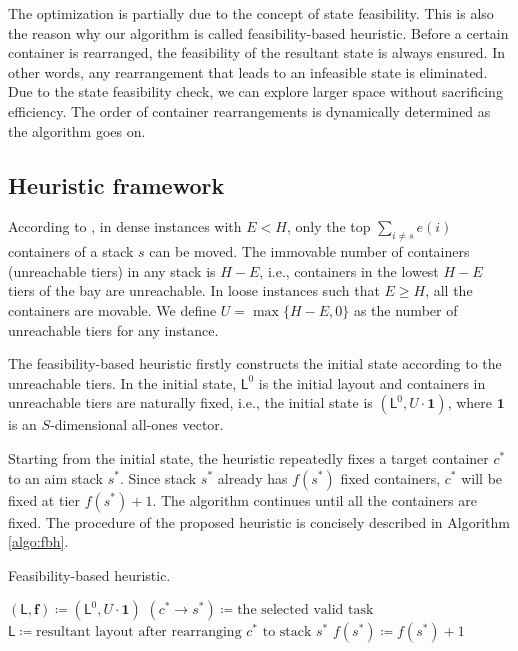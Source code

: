 \documentclass[review,3p,times,12pt,number]{elsarticle}\usepackage{amsmath}\usepackage{amssymb}
\renewcommand{\citet}[1]{\citeauthor{#1} \citep{#1}}
\renewcommand{\gets}{\coloneqq}
\newcommand{\setalgo}{\linespread{1}\fontsize{10}{12}\selectfont}
\begin{document}
The optimization is partially due to the concept of state feasibility.
This is also the reason why our algorithm is called feasibility-based heuristic.
Before a certain container is rearranged, the feasibility of the resultant state is always ensured.
In other words, any rearrangement that leads to an infeasible state is eliminated.
Due to the state feasibility check, we can explore larger space without sacrificing efficiency. The order of container rearrangements is dynamically determined as the algorithm goes on.



\subsection{Heuristic framework}

According to \citet{wang2014}, in dense instances with $E<H$, only the top $\sum_{i\neq s}e(i)$ containers of a stack $s$ can be moved. The immovable number of containers (unreachable tiers) in any stack is $H-E$, i.e., containers in the lowest $H-E$ tiers of the bay are unreachable.
In loose instances such that $E\ge H$, all the containers are movable.
We define $U=\max\{H-E,0\}$ as the number of unreachable tiers for any instance.


The feasibility-based heuristic firstly constructs the initial state according to the unreachable tiers. In the initial state, $\mathsf{L}^0$ is the initial layout and containers in unreachable tiers are naturally fixed, i.e., the initial state is $(\mathsf{L}^0,U\cdot\boldsymbol{1})$, where $\boldsymbol 1$ is an $S$-dimensional all-ones vector.

Starting from the initial state, the heuristic repeatedly fixes a target container $c^*$ to an aim stack $s^*$.
Since stack $s^*$ already has $f(s^*)$ fixed containers, $c^*$ will be fixed at tier $f(s^*)+1$. The algorithm continues until all the containers are fixed. The procedure of the proposed heuristic is concisely described in Algorithm \ref{algo:fbh}.

\begin{algorithm}[htbp]
\caption{Feasibility-based heuristic.}
\label{algo:fbh}


\setalgo


\Begin
{
  $(\mathsf{L},\boldsymbol{f})\gets (\mathsf{L}^0,U\cdot\boldsymbol{1})$\;
  {
    $(c^*\rightarrow s^*)\gets\textrm{the selected valid task}$\;
    $\mathsf{L} \gets \textrm{resultant layout after rearranging $c^*$ to stack $s^*$}$\;
    $f(s^*)\gets f(s^*)+1$\;
  }
}

\end{algorithm}
\end{document}
